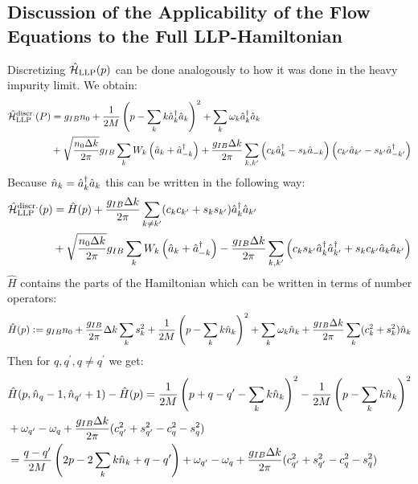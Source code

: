 \subsection{Discussion of the Applicability of the Flow Equations to the Full LLP-Hamiltonian}
Discretizing $\hat{\mathcal{H}}_{\mathrm{LLP}}(p)$ can be done analogously to how it was done in the heavy impurity limit. We obtain:
\begin{align}
\hat{\mathcal{H}}_{\mathrm{LLP}}^{\mathrm{discr.}}(P) &=g_{IB}n_0+\frac{1}{2M}\left(p-\sum\limits_k k \hat a^\dagger_k\hat a_k \right)^2+\sum\limits_k\omega_{ k}\hat a^\dagger_{ k}\hat a_{ k}\nonumber\\
&+\sqrt{\frac{n_0\Delta k}{2\pi}}g_{IB}\sum\limits_k W_k \left(\hat a_{ k}+\hat a^\dagger_{- k}\right) + \frac{g_{IB}\Delta k}{2\pi}\sum\limits_{k,k^\prime} \left(c_k\hat a^\dagger_k-s_k\hat a_{-k}\right)\left(c_{k^\prime}\hat a_{k^\prime}-s_{k^\prime}\hat a^\dagger_{-k^\prime}\right)
\end{align}
Because $\hat n_k=\hat a^\dagger_k\hat a_k$ this can be written in the following way:
\begin{align}
\hat{\mathcal{H}}_{\mathrm{LLP}}^{\mathrm{discr.}}(p) &=\hat H(p)+ \frac{g_{IB}\Delta k}{2\pi}\sum\limits_{k\neq k^\prime}(c_kc_{k^\prime}+s_ks_{k^\prime})\hat a^\dagger_k\hat a_{k^\prime}\nonumber\\
&+\sqrt{\frac{n_0\Delta k}{2\pi}}g_{IB}\sum\limits_k W_k \left(\hat a_{ k}+\hat a^\dagger_{- k}\right) - \frac{g_{IB}\Delta k}{2\pi}\sum\limits_{k,k^\prime} \left(c_ks_{k^\prime}\hat a^\dagger_k\hat a^\dagger_{k^\prime}+s_kc_{k^\prime}\hat a_{k}\hat a_{k^\prime}\right)
\end{align}
$\hat H$ contains the parts of the Hamiltonian which can be written in terms of number operators:
\begin{equation}
\hat H(p)\vcentcolon= g_{IB}n_0+\frac{g_{IB}}{2\pi}\Delta k\sum\limits_{k}s_k^2+\frac{1}{2M}\left(p-\sum\limits_k k \hat n_k \right)^2+\sum\limits_k\omega_{ k}\hat n_k+ \frac{g_{IB}\Delta k}{2\pi}\sum\limits_{k}(c_k^2+s_k^2)\hat n_k
\end{equation}
Then for $q,q^\prime,q\neq q^\prime$ we get:
\begin{align}\label{n_test_eq_thinking}
&\hat H(p,\hat n_q-1,\hat n_{q^\prime}+1)-\hat H(p)=\frac{1}{2M}\left(p+q-q^\prime-\sum\limits_k k \hat n_k \right)^2-\frac{1}{2M}\left(p-\sum\limits_k k \hat n_k \right)^2\nonumber \\
&+\omega_{q^\prime}-\omega_q + \frac{g_{IB}\Delta k}{2\pi}(c_{q^\prime}^2+s_{q^\prime}^2-c_{q}^2-s_{q}^2) \\
&=\frac{q-q^\prime}{2M}\left(2p-2\sum\limits_k k \hat n_k+q-q^\prime\right)+\omega_{q^\prime}-\omega_q + \frac{g_{IB}\Delta k}{2\pi}(c_{q^\prime}^2+s_{q^\prime}^2-c_{q}^2-s_{q}^2) \label{dangerous_maths}
\end{align}
